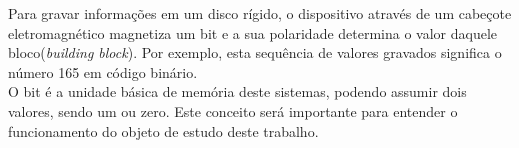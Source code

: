 Para gravar informações em um disco rígido, o dispositivo através de um cabeçote eletromagnético magnetiza um bit e a sua polaridade determina o valor daquele bloco(\textit{building block})\cite{hdd-image}. Por exemplo, esta sequência de valores gravados significa o número 165 em código binário.\\ O bit é a unidade básica de memória deste sistemas, podendo assumir dois valores, sendo um ou zero. Este conceito será importante para entender o funcionamento do objeto de estudo deste trabalho.


